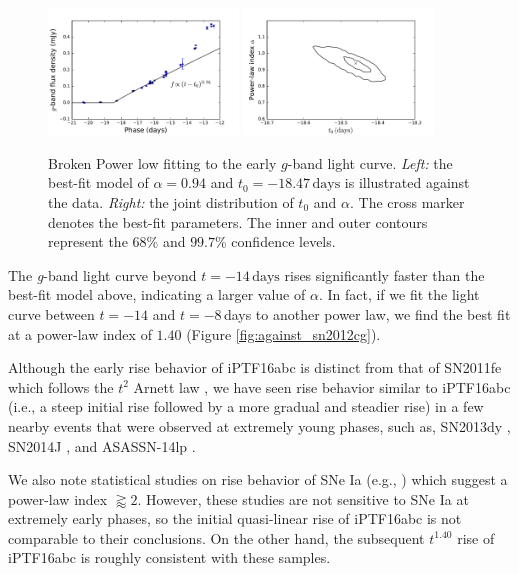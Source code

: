 \documentclass[twocolumn]{aastex61}
\begin{document}
\begin{figure}[htb]
  \centering
  \includegraphics[width=0.45\textwidth]{early_lc.pdf}
  \includegraphics[width=0.45\textwidth]{rise_time_power_law_index.pdf}
  \caption{Broken Power low fitting to the early $g$-band light
    curve. \textit{Left:} the best-fit model of $\alpha=0.94$ and
    $t_0=-18.47\,\textrm{days}$ is illustrated against the
    data. \textit{Right:} the joint distribution of $t_0$ and
    $\alpha$. The cross marker denotes the best-fit parameters. The
    inner and outer contours represent the $68\%$ and $99.7\%$
    confidence levels.}
  \label{fig:early_lc_fit}
\end{figure}

The \textit{g}-band light curve beyond $t=-14\,\textrm{days}$ rises
significantly faster than the best-fit model above, indicating a
larger value of $\alpha$. In fact, if we fit the light curve between
$t=-14$ and $t=-8$\,days to another power law, we find the best fit at
a power-law index of $1.40$ (Figure \ref{fig:against_sn2012cg}).

Although the early rise behavior of iPTF16abc is distinct from that of
SN2011fe \citep{2011Natur.480..344N} which follows the $t^2$ Arnett
law \citep{1982ApJ...253..785A}, we have seen rise behavior similar to
iPTF16abc (i.e., a steep initial rise followed by a more gradual and
steadier rise) in a few nearby events that were observed at extremely
young phases, such as, SN2013dy \citep{2013ApJ...778L..15Z}, SN2014J
\citep{2014ApJ...783L..24Z}, and ASASSN-14lp
\citep{2016ApJ...826..144S}.

We also note statistical studies on rise
behavior of SNe Ia (e.g., \citealt{2010ApJ...712..350H, 2011MNRAS.416.2607G,
  2012ApJ...745...44G, 2015MNRAS.446.3895F}) which suggest a power-law
index $\gtrapprox2$. However, these studies are not sensitive to SNe Ia
at extremely early phases, so the initial quasi-linear rise of iPTF16abc
is not comparable to their conclusions. On the other hand, the subsequent
$t^{1.40}$ rise of iPTF16abc is roughly consistent with these samples.
\end{document}
